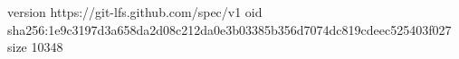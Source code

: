 version https://git-lfs.github.com/spec/v1
oid sha256:1e9c3197d3a658da2d08c212da0e3b03385b356d7074dc819cdeec525403f027
size 10348
